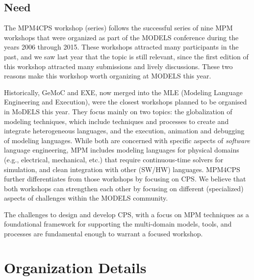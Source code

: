 \subsection{Need}
The MPM4CPS workshop (series) follows the successful series of nine MPM workshops that 
were organized as part of the MODELS conference during the years 2006 through 2015.
These workshops attracted many participants in the past, and we saw last year that the topic is still relevant, since the first edition of this workshop attracted many submissions and lively discussions.
These two reasons make this workshop worth organizing at MODELS this year.

Historically, GeMoC and EXE, now merged into the MLE (Modeling Language 
Engineering and Execution), were the closest workshops planned to be organised 
in MoDELS this year. They focus mainly on two topics: the globalization of
modeling techniques, which include techniques and processes to create and
integrate heterogeneous languages, and the execution, animation and debugging
of modeling languages. While both are concerned with specific aspects of 
\emph{software} language engineering, MPM includes modeling languages for 
physical domains (e.g., electrical, mechanical, etc.) that require 
continuous-time solvers for simulation, and clean integration with other (SW/HW) 
languages.
MPM4CPS further differentiates from those workshops by focusing on CPS. 
We believe that both workshops can strengthen each other by focusing on different 
(specialized) aspects of challenges within the MODELS community.


The challenges to design and develop CPS, with a focus on MPM techniques as a 
foundational framework for supporting the multi-domain models, tools, and 
processes are fundamental enough to warrant a focused workshop.

\section{Organization Details}
